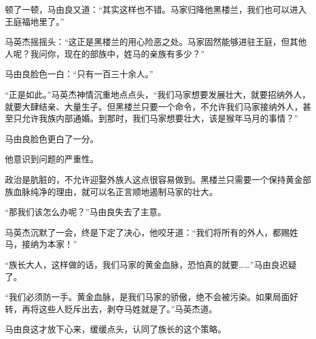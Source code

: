 \begin{this_body}
顿了一顿，马由良又道：“其实这样也不错。马家归降他黑楼兰，我们也可以进入王庭福地里了。”

马英杰摇摇头：“这正是黑楼兰的用心险恶之处。马家固然能够进驻王庭，但其他人呢？我问你，现在的部族中，姓马的亲族有多少？”

马由良脸色一白：“只有一百三十余人。”

“正是如此。”马英杰神情沉重地点点头，“我们马家想要发展壮大，就要招纳外人，就要大肆结亲、大量生子。但黑楼兰只要一个命令，不允许我们马家接纳外人，甚至只允许我族内部通婚。到那时，我们马家想要壮大，该是猴年马月的事情？”

马由良脸色更白了一分。

他意识到问题的严重性。

政治是肮脏的，不允许迎娶外族人这点很容易做到。黑楼兰只需要一个保持黄金部族血脉纯净的理由，就可以名正言顺地遏制马家的壮大。

“那我们该怎么办呢？”马由良失去了主意。

马英杰沉默了一会，终是下定了决心，他咬牙道：“我们将所有的外人，都赐姓马，接纳为本家！”

“族长大人，这样做的话，我们马家的黄金血脉，恐怕真的就要……”马由良迟疑了。

“我们必须防一手。黄金血脉，是我们马家的骄傲，绝不会被污染。如果局面好转，再将这些人贬斥出去，剥夺马姓就是了。”马英杰道。

马由良这才放下心来，缓缓点头，认同了族长的这个策略。

\end{this_body}

